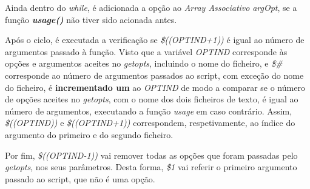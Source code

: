\documentclass[10pt,portuguese]{article}
\begin{document}
\newline
\newline
\newline
\newline
\newline
\par Ainda dentro do \textit{while}, é adicionada a opção ao \textit{Array Associativo} \textit{argOpt}, se a função \textbf{\textit{usage()}} não tiver sido acionada antes.
\par Após o ciclo, é executada a verificação se \textit{\$((OPTIND+1))} é igual ao número de argumentos passado à função. Visto que a variável \textit{OPTIND} corresponde às opções e argumentos aceites no \textit{getopts}, incluindo o nome do ficheiro, e \textit{\$\#} corresponde ao número de argumentos passados ao script, com exceção do nome do ficheiro, é \textbf{incrementado um} ao \textit{OPTIND} de modo a comparar se o número de opções aceites no \textit{getopts}, com o nome dos dois ficheiros de texto, é igual ao número de argumentos, executando a função \textit{usage} em caso contrário. Assim, \textit{\$((OPTIND))} e \textit{\$((OPTIND+1))} correspondem, respetivamente, ao índice do argumento do primeiro e do segundo ficheiro.
\par Por fim, \textit{\$((OPTIND-1))} vai remover todas as opções que foram passadas pelo \textit{getopts}, nos seus parâmetros. Desta forma, \textit{\$1} vai referir o primeiro argumento passado ao script, que não é uma opção.


\clearpage
\end{document}
